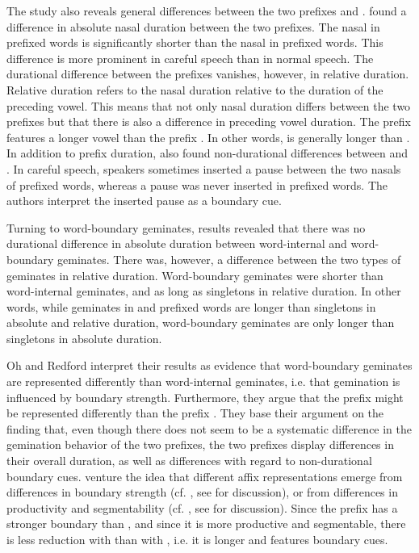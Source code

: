 The study also reveals general differences between the two prefixes  and . \cite{Oh.2012} found a difference in absolute nasal duration between the two prefixes. The nasal in prefixed words is significantly shorter than the nasal in prefixed words. This difference is more prominent in careful speech than in normal speech. The durational difference between the prefixes vanishes, however, in relative duration. Relative duration refers to the nasal duration relative to the duration of the preceding vowel. This means that not only nasal duration differs between the two prefixes but that there is also a difference in preceding vowel duration. The prefix  features a longer vowel than the prefix .  In other words,  is generally longer than . In addition to prefix duration, \cite{Oh.2012}
also found non-durational differences between  and . In careful speech, speakers sometimes inserted a pause between the two nasals of prefixed words, whereas a pause was never inserted in prefixed words. The authors interpret the inserted pause as a boundary cue.

Turning to word-boundary geminates,  results revealed that there was no durational difference in absolute duration between word-internal and word-boundary geminates. There was, however, a difference between the two types of geminates in relative duration. Word-boundary geminates were shorter than word-internal geminates, and as long as singletons in relative duration. In other words, while geminates in  and prefixed words are longer than singletons in absolute and relative duration, word-boundary geminates are only longer than singletons in absolute duration.


Oh and Redford interpret their results as evidence that word-boundary geminates are represented differently than word-internal geminates, i.e. that gemination is influenced by boundary strength.  Furthermore, they argue that the prefix  might be represented differently than the prefix . They base their argument on the finding that, even though there does not seem to be a systematic difference in the gemination behavior of the two prefixes, the two prefixes display differences in their overall duration, as well as differences with regard to non-durational boundary cues. \cite{Oh.2012} venture the idea that different affix representations emerge from differences in boundary strength (cf. \citealt{Kiparsky.1982,Mohanan.1986}, see  for discussion), or from differences in productivity and segmentability (cf. \citealt{Hay.2003}, see  for discussion). Since the prefix  has a stronger boundary than , and since it is more productive and segmentable, there is less reduction with  than with , i.e. it is longer and features boundary cues.


